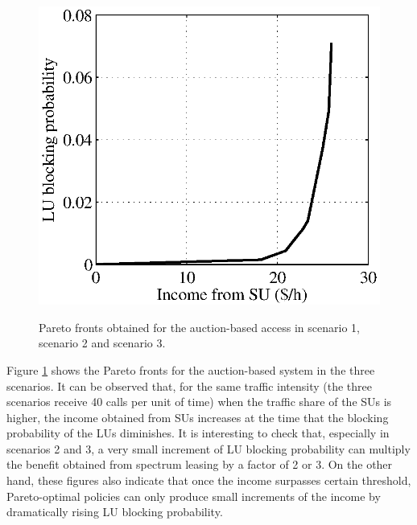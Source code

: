 \begin{figure}[h]
{\includegraphics[scale=0.4]{MDPauction1030.eps}
\label{fig:subfig3auction}
}
\caption[]{Pareto fronts obtained for the auction-based access in scenario 1, scenario 2 and scenario 3.}\label{fig:MDPauction}
\end{figure}

Figure \ref{fig:MDPauction} shows the Pareto fronts for the auction-based system in the three scenarios. It can be observed that, for the same traffic intensity (the three scenarios receive 40 calls per unit of time) when the traffic share of the SUs is higher, the income obtained from SUs increases at the time that the blocking probability of the LUs diminishes. It is interesting to check that, especially in scenarios 2 and 3, a very small increment of LU blocking probability can multiply the benefit obtained from spectrum leasing by a factor of 2 or 3. On the other hand, these figures also indicate that once the income surpasses certain threshold, Pareto-optimal policies can only produce small increments of the income by dramatically rising LU blocking probability.


